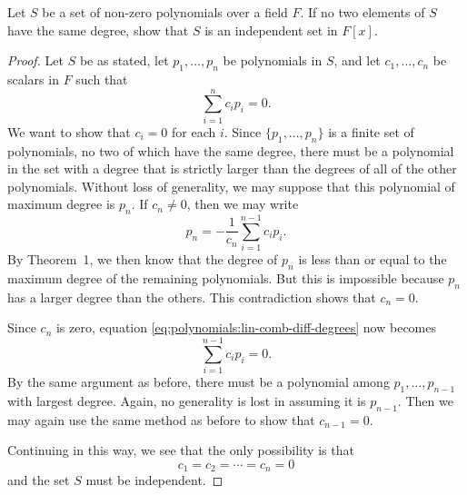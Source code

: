  Let $S$ be a set of non-zero polynomials over a field
$F$. If no two elements of $S$ have the same degree, show that $S$ is
an independent set in $F[x]$.
\begin{proof}
  Let $S$ be as stated, let $p_1,\dots,p_n$ be polynomials in $S$, and
  let $c_1,\dots,c_n$ be scalars in $F$ such that
  \begin{equation}
    \label{eq:polynomials:lin-comb-diff-degrees}
    \sum_{i=1}^nc_ip_i = 0.
  \end{equation}
  We want to show that $c_i = 0$ for each $i$. Since
  $\{p_1, \dots, p_n\}$ is a finite set of polynomials, no two of
  which have the same degree, there must be a polynomial in the set
  with a degree that is strictly larger than the degrees of all of the
  other polynomials. Without loss of generality, we may suppose that
  this polynomial of maximum degree is $p_n$. If $c_n\neq0$, then we
  may write
  \begin{equation*}
    p_n = -\frac1{c_n}\sum_{i=1}^{n-1}c_ip_i.
  \end{equation*}
  By Theorem~1, we then know that the degree of $p_n$ is less than or
  equal to the maximum degree of the remaining polynomials. But this
  is impossible because $p_n$ has a larger degree than
  the others. This contradiction shows that $c_n = 0$.

  Since $c_n$ is zero, equation
  \eqref{eq:polynomials:lin-comb-diff-degrees} now becomes
  \begin{equation*}
    \sum_{i=1}^{n-1}c_ip_i = 0.
  \end{equation*}
  By the same argument as before, there must be a polynomial among
  $p_1,\dots,p_{n-1}$ with largest degree. Again, no generality is
  lost in assuming it is $p_{n-1}$. Then we may again use the same
  method as before to show that $c_{n-1} = 0$.

  Continuing in this way, we see that the only possibility is that
  \begin{equation*}
    c_1 = c_2 = \cdots = c_n = 0
  \end{equation*}
  and the set $S$ must be independent.
\end{proof}
